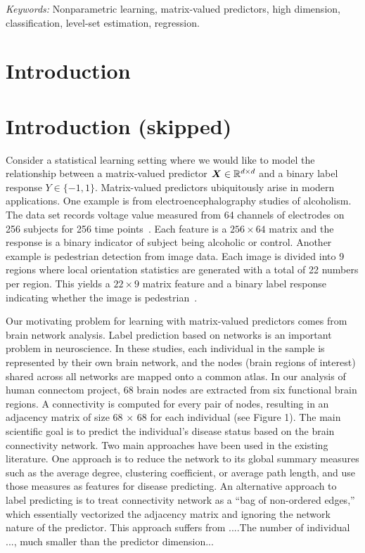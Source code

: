 \documentclass[12pt]{article}
\begin{document}
\noindent%
{\it Keywords:} Nonparametric learning, matrix-valued predictors, high dimension, classification, level-set estimation, regression.
\vfill


\newpage
{} %
\section{Introduction}
\label{sec:intro}


\section{Introduction (skipped)}
Consider a statistical learning setting where we would like to model the relationship between a matrix-valued predictor $\bm X \in \mathbb{R}^{d\times d}$ and a binary label response $Y\in\{-1,1\}$. Matrix-valued predictors ubiquitously arise in modern applications. One example is from electroencephalography studies of alcoholism. The data set records voltage value measured from 64 channels of electrodes on 256 subjects for 256 time points~\citep{zhou2014regularized}. Each feature is a $256\times 64$ matrix and the response is a binary indicator of subject being alcoholic or control. Another example is pedestrian detection from image data. Each image is divided into 9 regions where local orientation statistics are generated with a total of 22 numbers per region. This yields a $22 \times 9$ matrix feature and a binary label response indicating whether the image is pedestrian~\citep{Shashua2004Pedestrian}. 


Our motivating problem for learning with matrix-valued predictors comes from brain network analysis. Label prediction based on networks is an important problem in neuroscience. In these studies, each individual in the sample is represented by their own brain network, and the nodes (brain regions of interest) shared across all networks are mapped onto a common atlas. In our analysis of human connectom project, 68 brain nodes are extracted from six functional brain regions. A connectivity is computed for every pair of nodes, resulting in an adjacency matrix of size 68 $\times$ 68 for each individual (see Figure 1). The main scientific goal is to predict the individual's disease status based on the brain connectivity network. Two main approaches have been used in the existing literature. One approach is to reduce the network to its global summary measures such as the average degree, clustering coefficient, or average path length, and use those measures as features for disease predicting. An alternative approach to label predicting is to treat connectivity network as a ``bag of non-ordered edges,'' which essentially vectorized the adjacency matrix and ignoring the network nature of the predictor. This approach suffers from ....The number of individual ..., much smaller than the predictor dimension... 
\end{document}
